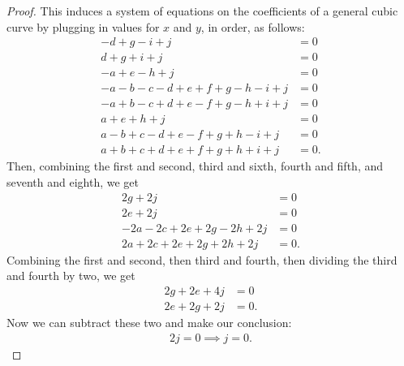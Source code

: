 \documentclass[12pt]{article}
\theoremstyle{definition}
\begin{document}
\begin{proof}
	This induces a system of equations on the coefficients of a general cubic curve by plugging in values for $x$ and $y$, in order, as follows: \begin{align*}
		- d + g - i + j                         & = 0  \\
		d + g + i + j                           & = 0  \\
		- a + e - h + j                         & = 0  \\
		- a - b - c - d + e + f + g - h - i + j & = 0  \\
		- a + b - c + d + e - f + g - h + i + j & = 0  \\
		a + e + h + j                           & = 0  \\
		a - b + c - d + e - f + g + h - i + j   & = 0  \\
		a + b + c + d + e + f + g + h + i + j   & = 0.
	\end{align*}
	Then, combining the first and second, third and sixth, fourth and fifth, and seventh and eighth, we get \begin{align*}
		2g + 2j                       & = 0  \\
		2e + 2j                       & = 0  \\
		- 2a - 2c + 2e + 2g - 2h + 2j & = 0  \\
		2a + 2c + 2e + 2g + 2h + 2j   & = 0.
	\end{align*}
	Combining the first and second, then third and fourth, then dividing the third and fourth by two, we get \begin{align*}
		2g + 2e + 4j & = 0  \\
		2e + 2g + 2j & = 0.
	\end{align*}
  Now we can subtract these two and make our conclusion: \begin{align*}
    2j = 0 \implies j = 0.
  \end{align*}
\end{proof}
\end{document}
